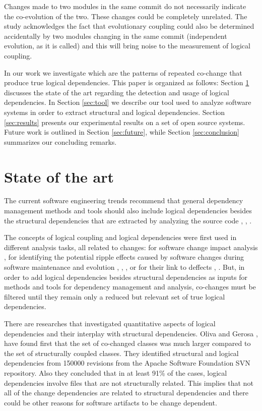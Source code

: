 \documentclass[conference]{IEEEtran}
\begin{document}
Changes made to two modules in the same commit do not necessarily indicate the co-evolution of the two. These changes could be completely unrelated. The study \cite{Yu2007} acknowledges the fact that evolutionary coupling could also be determined accidentally by two modules changing in the same commit (independent evolution, as it is called) and this will bring noise to the measurement of logical coupling. 

In our work we investigate which are the patterns of repeated co-change that produce true logical dependencies. This paper is organized as follows: Section \ref{sec:state} discusses the state of the art regarding the detection and usage of logical dependencies. In Section \ref{sec:tool} we describe our tool used to analyze software systems in order to extract structural and logical dependencies. Section \ref{sec:results} presents our experimental results on a set of open source systems. Future work is outlined in Section \ref{sec:future}, while Section \ref{sec:conclusion} summarizes our concluding remarks.



\section{State of the art}
\label{sec:state}
The current software engineering trends recommend that general dependency management methods and tools should also include logical dependencies besides the structural dependencies that are extracted by analyzing the source code \cite{Oliva:2011:ISL:2067853.2068086}, \cite{DBLP:journals/jss/AjienkaC17}, \cite{Yu2007}. 

The concepts of logical coupling and logical dependencies were first used in different analysis tasks, all related to changes: for software change impact analysis \cite{1553643}, for identifying the potential ripple effects caused by software changes during software maintenance and evolution \cite{DBLP:conf/issre/OlivaG15}, \cite{Oliva:2011:ISL:2067853.2068086}, \cite{Poshyvanyk2009}, \cite{posh2010} or for their link to deffects \cite{wiese}, \cite{Zimmermann:2004:MVH:998675.999460}. But, in order to add logical dependencies besides structural dependencies as inputs for methods and tools for dependency management and analysis, co-changes must be filtered until they remain only a reduced but relevant set of true logical dependencies. 

There are researches that investigated quantitative aspects of logical dependencies and their interplay with structural dependencies. 
Oliva and Gerosa \cite{Oliva:2011:ISL:2067853.2068086}, \cite{DBLP:conf/issre/OlivaG15} have found first that the set of co-changed classes was much larger compared to the set of structurally coupled classes. They identified structural and logical dependencies from 150000 revisions from the Apache Software Foundation SVN repository. Also they concluded  that in at least 91\% of the cases, logical dependencies involve files that are not structurally related. This implies that not all of the change dependencies are related to structural dependencies and there could be other reasons for software artifacts to be change dependent.
\end{document}
